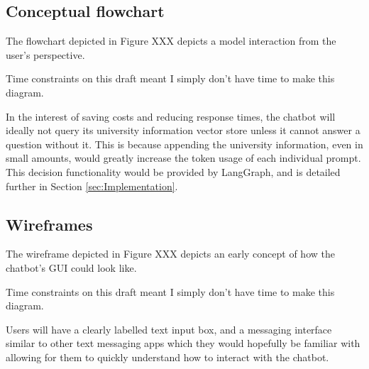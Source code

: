 



\subsection{Conceptual flowchart}
The flowchart depicted in Figure XXX depicts a model interaction from the user's perspective.

\begin{tcolorbox}[colback=red!5!white,colframe=red!75!black,title=Not present in draft]
    Time constraints on this draft meant I simply don't have time to make this diagram.
\end{tcolorbox}

\noindent In the interest of saving costs and reducing response times, the chatbot will ideally not query its university information vector store 
unless it cannot answer a question without it. This is because appending the university information, even in small amounts, would 
greatly increase the token usage of each individual prompt. This decision functionality would be provided by LangGraph, and is detailed 
further in Section \ref{sec:Implementation}.

\subsection{Wireframes}
The wireframe depicted in Figure XXX depicts an early concept of how the chatbot's GUI could look like.

\begin{tcolorbox}[colback=red!5!white,colframe=red!75!black,title=Not present in draft]
    Time constraints on this draft meant I simply don't have time to make this diagram.
\end{tcolorbox}

\noindent Users will have a clearly labelled text input box, and a messaging interface similar to other text messaging apps 
which they would hopefully be familiar with allowing for them to quickly understand how to interact with the chatbot.